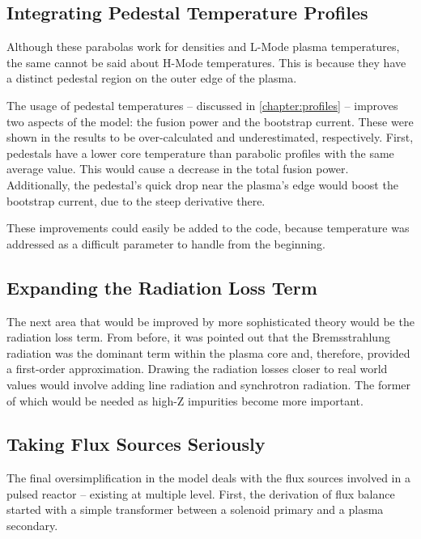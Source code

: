 \subsection{Integrating Pedestal Temperature Profiles}

 Although these parabolas work for densities and L-Mode plasma temperatures, the same cannot be said about H-Mode temperatures. This is because they have a distinct pedestal region on the outer edge of the plasma.

The usage of pedestal temperatures -- discussed in \cref{chapter:profiles} -- improves two aspects of the model: the fusion power and the bootstrap current. These were shown in the results to be over-calculated and underestimated, respectively. First, pedestals have a lower core temperature than parabolic profiles with the same average value. This would cause a decrease in the total fusion power. Additionally, the pedestal's quick drop near the plasma's edge would boost the bootstrap current, due to the steep derivative there.

These improvements could easily be added to the code, because temperature was addressed as a difficult parameter to handle from the beginning.

\subsection{Expanding the Radiation Loss Term}

The next area that would be improved by more sophisticated theory would be the radiation loss term. From before, it was pointed out that the Bremsstrahlung radiation was the dominant term within the plasma core and, therefore, provided a first-order approximation. Drawing the radiation losses closer to real world values would involve adding line radiation and synchrotron radiation. The former of which would be needed as high-Z impurities become more important.

\subsection{Taking Flux Sources Seriously}

The final oversimplification in the model deals with the flux sources involved in a pulsed reactor -- existing at multiple level. First, the derivation of flux balance started with a simple transformer between a solenoid primary and a plasma secondary. 

